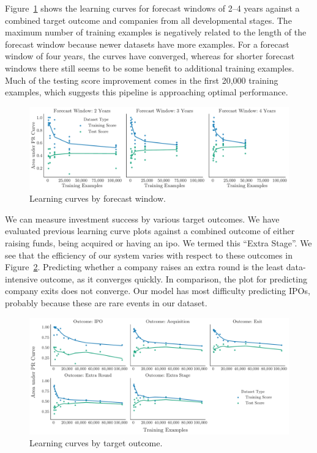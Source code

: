 \documentclass[../thesis/thesis.tex]{subfiles}
\begin{document}
Figure~\ref{fig:evaluation:learning_window} shows the learning curves for forecast windows of 2--4 years against a combined target outcome and companies from all developmental stages. The maximum number of training examples is negatively related to the length of the forecast window because newer datasets have more examples. For a forecast window of four years, the curves have converged, whereas for shorter forecast windows there still seems to be some benefit to additional training examples. Much of the testing score improvement comes in the first 20,000 training examples, which suggests this pipeline is approaching optimal performance.

\begin{figure}[!htb]
    \centering
    \includegraphics[width=\textwidth]{../figures/evaluation/learning_curves_window}
    \caption[Learning curves by forecast window]{Learning curves by forecast window.}
    \label{fig:evaluation:learning_window}
\end{figure}

We can measure investment success by various target outcomes. We have evaluated previous learning curve plots against a combined outcome of either raising funds, being acquired or having an \gls{ipo}. We termed this ``Extra Stage''. We see that the efficiency of our system varies with respect to these outcomes in Figure~\ref{fig:evaluation:learning_outcome_window}. Predicting whether a company raises an extra round is the least data-intensive outcome, as it converges quickly. In comparison, the plot for predicting company exits does not converge. Our model has most difficulty predicting IPOs, probably because these are rare events in our dataset.

\begin{figure}[!htb]
    \centering
    \includegraphics[width=\textwidth]{../figures/evaluation/learning_curves_outcome}
    \caption[Learning curves by target outcome]{Learning curves by target outcome.}
    \label{fig:evaluation:learning_outcome_window}
\end{figure}
\end{document}
